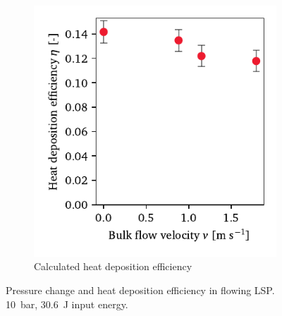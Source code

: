 \begin{figure}[h]
\begin{subfigure}[t]{0.47\textwidth}
                \includegraphics[width=\textwidth]{assets/5 results/flow_eta}
                \caption{Calculated heat deposition efficiency}
                \label{fig:flow_pressure_efficiency}
            \end{subfigure}
            \caption[Pressure change and heat deposition efficiency in flowing LSP]{Pressure change and heat deposition efficiency in flowing LSP. \qty{10}{bar}, \qty{30.6}{J} input energy.}
            \label{fig:flow_pressure}
        \end{figure}